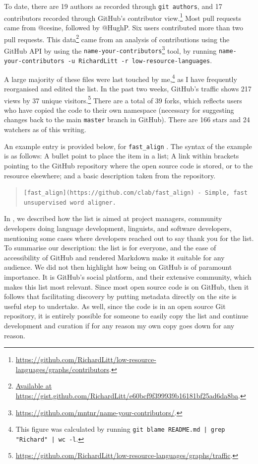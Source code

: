 To date, there are 19 authors as recorded through {\tt git authors}, and 17 contributors recorded through GitHub's contributor view.\footnote{\href{https://github.com/RichardLitt/low-resource-languages/graphs/contributors}{https://github.com/RichardLitt/low-resource-languages/graphs/contributors}. } Most pull requests came from @cesine, followed by @HughP. Six users contributed more than two pull requests. This data\footnote{\href{https://gist.github.com/RichardLitt/e60bcf9f399939b16181bf25ad6da8ba}{Available at https://gist.github.com/RichardLitt/e60bcf9f399939b16181bf25ad6da8ba}. } came from an analysis of contributions using the GitHub API by using the {\tt name-your-contributors}\footnote{\href{https://github.com/mntnr/name-your-contributors/}{https://github.com/mntnr/name-your-contributors/}. } tool, by running {\tt name-your-contributors -u RichardLitt -r low-resource-languages}.

A large majority of these files were last touched by me,\footnote{This figure was calculated by running {\tt git blame README.md | grep "Richard" | wc -l}.} as I have frequently reorganised and edited the list. In the past two weeks, GitHub's traffic shows 217 views by 37 unique visitors.\footnote{\href{https://github.com/RichardLitt/low-resource-languages/graphs/traffic}{https://github.com/RichardLitt/low-resource-languages/graphs/traffic}. } There are a total of 39 forks, which reflects users who have copied the code to their own namespace (necessary for suggesting changes back to the main {\tt master} branch in GitHub). There are 166 stars and 24 watchers as of this writing.

An example entry is provided below, for {\tt fast\_align} \citep{dyer2013simple}. The syntax of the example is as follows: A bullet point to place the item in a list; A link within brackets pointing to the GitHub repository where the open source code is stored, or to the resource elsewhere; and a basic description taken from the repository.

\begin{quote}
{\tt * [fast\_align](https://github.com/clab/fast\_align) - Simple, fast unsupervised word aligner.}
\end{quote}

In \citet{CCURL}, we described how the list is aimed at project managers, community developers doing language development, linguists, and software developers, mentioning some cases where developers reached out to say thank you for the list. To summarise our description: the list is for everyone, and the ease of accessibility of GitHub and rendered Markdown make it suitable for any audience. We did not then highlight how being on GitHub is of paramount importance. It is GitHub's social platform, and their extensive community, which makes this list most relevant. Since most open source code is on GitHub, then it follows that facilitating discovery by putting metadata directly on the site is useful step to undertake. As well, since the code is in an open source Git repository, it is entirely possible for someone to easily copy the list and continue development and curation if for any reason my own copy goes down for any reason.

